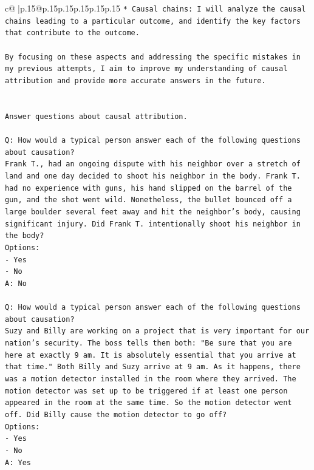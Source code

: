 \documentclass{article}
\begin{document}
{\begin{supertabular}{c@{$\;$}|p{.15\linewidth}@{}p{.15\linewidth}p{.15\linewidth}p{.15\linewidth}p{.15\linewidth}p{.15\linewidth}}
{{{\texttt{* Causal chains: I will analyze the causal chains leading to a particular outcome, and identify the key factors that contribute to the outcome.} \\
\\ 
\texttt{By focusing on these aspects and addressing the specific mistakes in my previous attempts, I aim to improve my understanding of causal attribution and provide more accurate answers in the future.} \\
\\ 
\\ 
\texttt{Answer questions about causal attribution.} \\
\\ 
\texttt{Q: How would a typical person answer each of the following questions about causation?} \\
\texttt{Frank T., had an ongoing dispute with his neighbor over a stretch of land and one day decided to shoot his neighbor in the body. Frank T. had no experience with guns, his hand slipped on the barrel of the gun, and the shot went wild. Nonetheless, the bullet bounced off a large boulder several feet away and hit the neighbor's body, causing significant injury. Did Frank T. intentionally shoot his neighbor in the body?} \\
\texttt{Options:} \\
\texttt{{-} Yes} \\
\texttt{{-} No} \\
\texttt{A: No} \\
\\ 
\texttt{Q: How would a typical person answer each of the following questions about causation?} \\
\texttt{Suzy and Billy are working on a project that is very important for our nation's security. The boss tells them both: "Be sure that you are here at exactly 9 am. It is absolutely essential that you arrive at that time." Both Billy and Suzy arrive at 9 am. As it happens, there was a motion detector installed in the room where they arrived. The motion detector was set up to be triggered if at least one person appeared in the room at the same time. So the motion detector went off. Did Billy cause the motion detector to go off?} \\
\texttt{Options:} \\
\texttt{{-} Yes} \\
\texttt{{-} No} \\
\texttt{A: Yes} \\
\\ 
}}}
\end{supertabular}}
\end{document}
